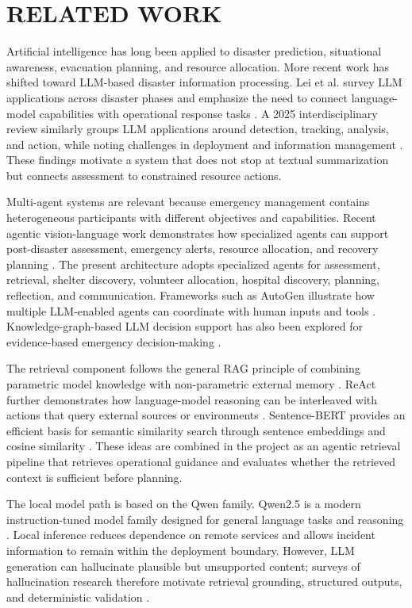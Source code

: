 \documentclass[conference]{IEEEtran}
\begin{document}
\section{RELATED WORK}
Artificial intelligence has long been applied to disaster prediction, situational awareness, evacuation planning, and resource allocation. More recent work has shifted toward LLM-based disaster information processing. Lei et al. survey LLM applications across disaster phases and emphasize the need to connect language-model capabilities with operational response tasks \cite{b1}. A 2025 interdisciplinary review similarly groups LLM applications around detection, tracking, analysis, and action, while noting challenges in deployment and information management \cite{b2}. These findings motivate a system that does not stop at textual summarization but connects assessment to constrained resource actions.

Multi-agent systems are relevant because emergency management contains heterogeneous participants with different objectives and capabilities. Recent agentic vision-language work demonstrates how specialized agents can support post-disaster assessment, emergency alerts, resource allocation, and recovery planning \cite{b3}. The present architecture adopts specialized agents for assessment, retrieval, shelter discovery, volunteer allocation, hospital discovery, planning, reflection, and communication. Frameworks such as AutoGen illustrate how multiple LLM-enabled agents can coordinate with human inputs and tools \cite{b14}. Knowledge-graph-based LLM decision support has also been explored for evidence-based emergency decision-making \cite{b15}.

The retrieval component follows the general RAG principle of combining parametric model knowledge with non-parametric external memory \cite{b4}. ReAct further demonstrates how language-model reasoning can be interleaved with actions that query external sources or environments \cite{b5}. Sentence-BERT provides an efficient basis for semantic similarity search through sentence embeddings and cosine similarity \cite{b6}. These ideas are combined in the project as an agentic retrieval pipeline that retrieves operational guidance and evaluates whether the retrieved context is sufficient before planning.

The local model path is based on the Qwen family. Qwen2.5 is a modern instruction-tuned model family designed for general language tasks and reasoning \cite{b7}. Local inference reduces dependence on remote services and allows incident information to remain within the deployment boundary. However, LLM generation can hallucinate plausible but unsupported content; surveys of hallucination research therefore motivate retrieval grounding, structured outputs, and deterministic validation \cite{b8}.
\end{document}
